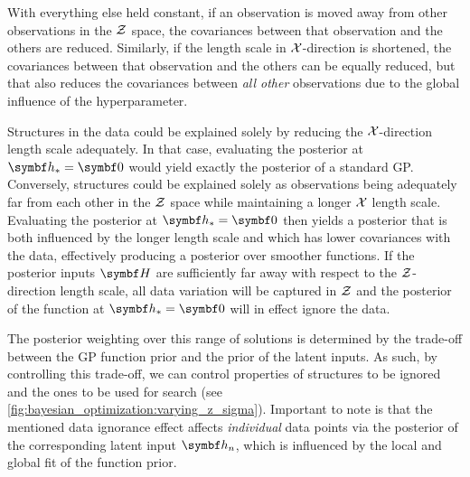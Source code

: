 With everything else held constant, if an observation is moved away from other observations in the $\mathcal{Z}$ space, the covariances between that observation and the others are reduced.
Similarly, if the length scale in $\mathcal{X}$-direction is shortened, the covariances between that observation and the others can be equally reduced, but that also reduces the covariances between \emph{all other} observations due to the global influence of the hyperparameter.

Structures in the data could be explained solely by reducing the $\mathcal{X}$-direction length scale adequately.
In that case, evaluating the posterior at $\mat{h}_\ast = \mat{0}$ would yield exactly the posterior of a standard GP.
Conversely, structures could be explained solely as observations being adequately far from each other in the $\mathcal{Z}$ space while maintaining a longer $\mathcal{X}$ length scale.
Evaluating the posterior at $\mat{h}_\ast = \mat{0}$ then yields a posterior that is both influenced by the longer length scale and which has lower covariances with the data, effectively producing a posterior over smoother functions.
If the posterior inputs $\mat{H}$ are sufficiently far away with respect to the $\mathcal{Z}$-direction length scale,
all data variation will be captured in $\mathcal{Z}$ and the posterior of the function at $\mat{h}_\ast = \mat{0}$ will in effect ignore the data.

The posterior weighting over this range of solutions is determined by the trade-off between the GP function prior and the prior of the latent inputs.
As such, by controlling this trade-off, we can control properties of structures to be ignored and the ones to be used for search (see \cref{fig:bayesian_optimization:varying_z_sigma}).
Important to note is that the mentioned data ignorance effect affects \emph{individual} data points via the posterior of the corresponding latent input $\mat{h}_n$,
which is influenced by the local and global fit of the function prior.

